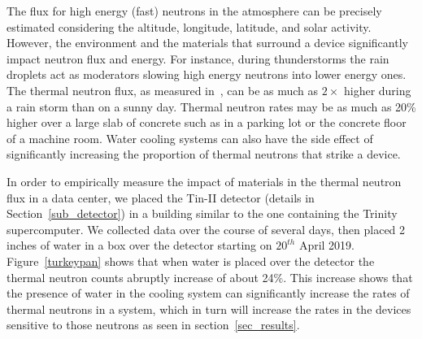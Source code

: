 \label{sub_flux}

The flux for high energy (fast) neutrons in the atmosphere can be precisely estimated considering the
altitude, longitude, latitude, and solar activity. However, the environment and the materials that surround a device significantly impact neutron flux and energy. 
For instance, during thunderstorms the rain droplets act as moderators slowing high
energy neutrons into lower energy ones. The thermal neutron flux, as measured
in~\cite{ziegler2003}, can be as much as $2\times$ higher during a rain storm than on a sunny day. Thermal neutron rates may be as much as 20\% higher over a large slab of concrete such as in a parking lot or the concrete floor of a machine room. 
Water cooling systems can also have the side effect of significantly 
increasing the proportion of thermal neutrons that strike a device.

In order to  empirically measure the impact of materials in the thermal neutron flux in a data center, we placed the Tin-II detector (details in Section~\ref{sub_detector}) in a building similar to the one containing the Trinity supercomputer. We collected data over the course of several days, then placed 2 inches of water in a box over the detector starting on $20^{th}$ April 2019. Figure~\ref{turkeypan} shows that when water is placed over the detector the thermal neutron counts abruptly increase of about 24\%. This increase shows that the presence of water in the cooling system can significantly increase the rates of thermal neutrons in a system, which in turn will increase the rates in the devices sensitive to those neutrons as seen in section~\ref{sec_results}. 





